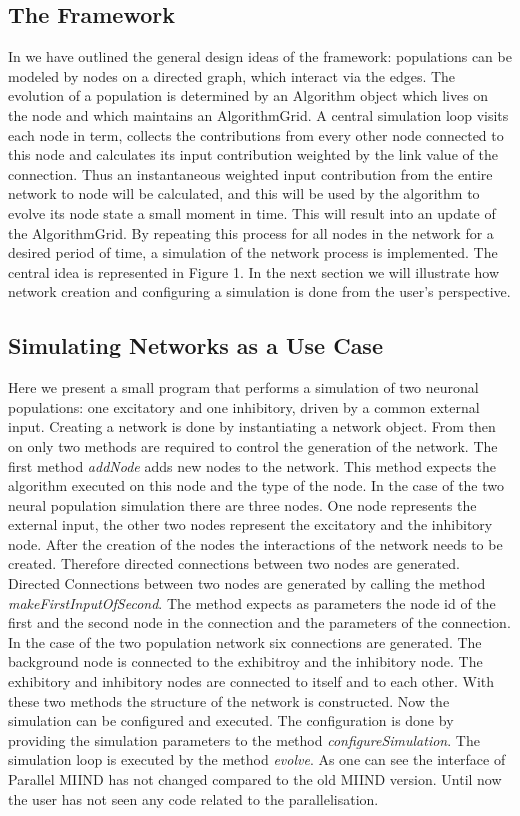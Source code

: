 \documentclass[12pt]{article}
\begin{document}
\subsection{The Framework}
In \citep{dekamps2008} we have outlined the general design ideas of the framework: populations can be modeled by nodes on a directed graph, 
which interact via the edges. The evolution of a population is determined by an Algorithm object which lives on the node and which maintains an 
AlgorithmGrid. A central simulation loop visits each node in term, collects the contributions from every other node connected to this node and calculates 
its input contribution weighted by the link value of the connection. Thus an instantaneous weighted input contribution from the entire network to node will 
be calculated, and this will be used by the algorithm to evolve its node state a small moment in time. This will result into an update of the AlgorithmGrid. 
By repeating this process for all nodes in the network for a desired period of time, a simulation of the network process is implemented. 
The central idea is represented in Figure 1. In the next section we will illustrate how network creation and configuring a simulation is done 
from the user's perspective.
\subsection{Simulating Networks as a Use Case}
Here we present a small program that performs a simulation of two neuronal populations: one excitatory and one inhibitory, driven by a common external
input. Creating a network is done by instantiating a network object. From then on only two methods are required to control the generation of the network.
The first method \emph{addNode} adds new nodes to the network. This method expects the algorithm executed on this node and the type of the node. In the case of the two neural population simulation there are three nodes. One node represents the external input, the other two nodes represent the excitatory and the inhibitory node.
After the creation of the nodes the interactions of the network needs to be created. Therefore directed connections between two nodes are generated. Directed Connections between two nodes are generated by calling the method \emph{makeFirstInputOfSecond}. The method expects as parameters the node id of the first and the second node in the connection and the parameters of the connection.
In the case of the two population network six connections are generated. The background node is connected to the exhibitroy and the inhibitory node. The exhibitory and inhibitory nodes are connected to itself and to each other.
With these two methods the structure of the network is constructed. Now the simulation can be configured and executed. The configuration is done by providing the simulation parameters to the method \emph{configureSimulation}. The simulation loop is executed by the method \emph{evolve}.
As one can see the interface of Parallel MIIND has not changed compared to the old MIIND version. Until now the user has not seen any code related to the parallelisation.
\end{document}
